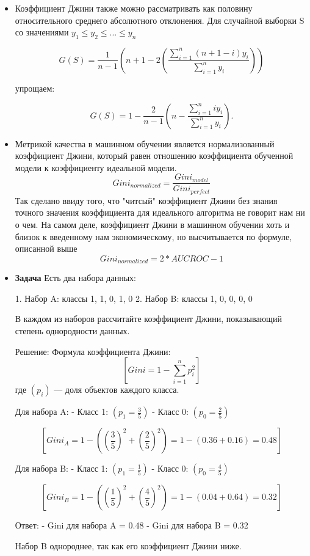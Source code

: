\begin{itemize}
    \item Коэффициент Джини также можно рассматривать как половину относительного среднего абсолютного отклонения. Для случайной выборки S со значениями $y_1 \leq y_2 \leq ... \leq y_n$

          $${\displaystyle G(S)={\frac {1}{n-1}}\left(n+1-2\left({\frac {\sum _{i=1}^{n}(n+1-i)y_{i}}{\sum _{i=1}^{n}y_{i}}}\right)\right)}$$

          упрощаем:

          $${\displaystyle G(S)=1-{\frac {2}{n-1}}\left(n-{\frac {\sum _{i=1}^{n}iy_{i}}{\sum _{i=1}^{n}y_{i}}}\right).}$$

    \item Метрикой качества в машинном обучении является нормализованный коэффициент Джини, который равен отношению коэффициента обученной модели к коэффициенту идеальной модели.
          $$Gini_{normalized} = \frac{Gini_{model}}{Gini_{perfect}} $$
          Так сделано ввиду того, что "читсый" коэффициент Джини без знания точного значения коэффициента для идеального алгоритма не говорит нам ни о чем.
          На самом деле, коэффициент Джини в машинном обучении хоть и близок к введенному нам экономическому, но высчитывается по формуле, описанной выше
          $$Gini_{normalized} = 2 * AUCROC - 1$$

    \item {\bf Задача}
          Есть два набора данных:

          1. Набор A: классы 1, 1, 0, 1, 0
          2. Набор B: классы 1, 0, 0, 0, 0

          В каждом из наборов рассчитайте коэффициент Джини, показывающий степень однородности данных.

          Решение:
          Формула коэффициента Джини:
          $$[
                      Gini = 1 - \sum_{i=1}^{n} p_i^2
                  ]  $$
          где $(p_i)$ — доля объектов каждого класса.

          Для набора A:
          - Класс 1: $(p_1 = \frac{3}{5})$
          - Класс 0: $(p_0 = \frac{2}{5})$

          $$[
                      Gini_A = 1 - \left(\left(\frac{3}{5}\right)^2 + \left(\frac{2}{5}\right)^2\right) = 1 - \left(0.36 + 0.16\right) = 0.48
                  ]$$

          Для набора B:
          - Класс 1: $(p_1 = \frac{1}{5}) $
          - Класс 0: $(p_0 = \frac{4}{5}) $

          $$[
                      Gini_B = 1 - \left(\left(\frac{1}{5}\right)^2 + \left(\frac{4}{5}\right)^2\right) = 1 - \left(0.04 + 0.64\right) = 0.32
                  ]$$

          Ответ:
          - Gini для набора A = 0.48
          - Gini для набора B = 0.32

          Набор B однороднее, так как его коэффициент Джини ниже.

\end{itemize}

